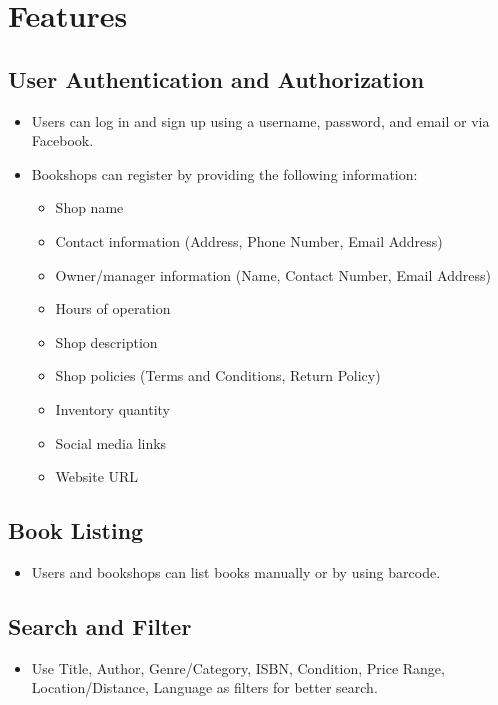 \documentclass{article}
\begin{document}
\section{Features}

\subsection{User Authentication and Authorization}
\begin{itemize}
  \item Users can log in and sign up using a username, password, and email or via Facebook.
  \item Bookshops can register by providing the following information:
  \begin{itemize}
    \item Shop name
    \item Contact information (Address, Phone Number, Email Address)
    \item Owner/manager information (Name, Contact Number, Email Address)
    \item Hours of operation
    \item Shop description
    \item Shop policies (Terms and Conditions, Return Policy)
    \item Inventory quantity
    \item Social media links
    \item Website URL
  \end{itemize}
\end{itemize}

\subsection{Book Listing}
\begin{itemize}
  \item Users and bookshops can list books manually or by using barcode.
\end{itemize}

\subsection{Search and Filter}
\begin{itemize}
  \item Use Title, Author, Genre/Category, ISBN, Condition, Price Range, Location/Distance, Language as filters for better search.
\end{itemize}
\end{document}
